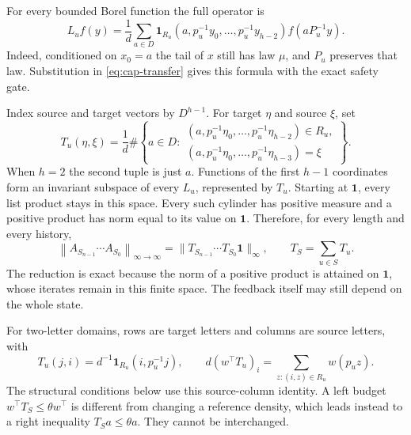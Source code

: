 \documentclass[11pt,reqno]{amsart}
\numberwithin{equation}{section}
\theoremstyle{definition}
\theoremstyle{definition}
\newcommand{\one}{\mathbf 1}
\newcommand{\opnorm}[1]{\left\|#1\right\|_{\infty\to\infty}}
\begin{document}
For every bounded Borel function the full operator is
\begin{equation}\label{eq:cyl-operator}
 L_uf(y)=\frac1d\sum_{a\in D}
 \one_{R_u}(a,p_u^{-1}y_0,\ldots,p_u^{-1}y_{h-2})
 f(aP_u^{-1}y).
\end{equation}
Indeed, conditioned on $x_0=a$ the tail of $x$ still has law $\mu$,
and $P_u$ preserves that law. Substitution in
\eqref{eq:cap-transfer} gives this formula with the exact safety gate.

Index source and target vectors by $D^{h-1}$. For target $\eta$
and source $\xi$, set
\begin{equation}\label{eq:cyl-matrix}
 T_u(\eta,\xi)=\frac1d\#\left\{a\in D:
 \begin{array}{l}
 (a,p_u^{-1}\eta_0,\ldots,p_u^{-1}\eta_{h-2})\in R_u,\\
 (a,p_u^{-1}\eta_0,\ldots,p_u^{-1}\eta_{h-3})=\xi
 \end{array}\right\}.
\end{equation}
When $h=2$ the second tuple is just $a$.
Functions of the first $h-1$ coordinates form an invariant subspace
of every $L_u$, represented by $T_u$. Starting at $\one$, every
list product stays in this space. Every such cylinder has positive
measure and a positive product has norm equal to its value on $\one$.
Therefore, for every length and every history,
\begin{equation}\label{eq:cyl-fullnorm}
 \opnorm{A_{S_{n-1}}\cdots A_{S_0}}
 =\|T_{S_{n-1}}\cdots T_{S_0}\one\|_\infty,
 \qquad T_S=\sum_{u\in S}T_u.
\end{equation}
The reduction is exact because the norm of a positive product is
attained on $\one$, whose iterates remain in this finite space.
The feedback itself may still depend on the whole state.

For two-letter domains, rows are target letters and columns are
source letters, with
\begin{equation}\label{eq:cyl-two}
 T_u(j,i)=d^{-1}\one_{R_u}(i,p_u^{-1}j),\qquad
 d(w^\top T_u)_i=\sum_{z:(i,z)\in R_u}w(p_uz).
\end{equation}
The structural conditions below use this source-column identity.
A left budget $w^\top T_S\le\theta w^\top$ is different from
changing a reference density, which leads instead to a right
inequality $T_Sa\le\theta a$. They cannot be interchanged.
\end{document}
